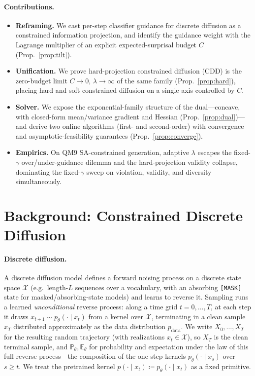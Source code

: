 \documentclass{article}
\newcommand{\E}{\mathbb{E}}
\newcommand{\X}{\mathcal{X}}
\begin{document}
\paragraph{Contributions.}
\begin{itemize}
\item \textbf{Reframing.} We cast per-step classifier guidance for discrete diffusion as a constrained information projection, and identify the guidance weight with the Lagrange multiplier of an explicit expected-surprisal budget $C$ (Prop.~\ref{prop:tilt}).
\item \textbf{Unification.} We prove hard-projection constrained diffusion (CDD) is the zero-budget limit $C\!\to\!0$, $\lambda\!\to\!\infty$ of the same family (Prop.~\ref{prop:hard}), placing hard and soft constrained diffusion on a single axis controlled by $C$.
\item \textbf{Solver.} We expose the exponential-family structure of the dual---concave, with closed-form mean/variance gradient and Hessian (Prop.~\ref{prop:dual})---and derive two online algorithms (first- and second-order) with convergence and asymptotic-feasibility guarantees (Prop.~\ref{prop:converge}).
\item \textbf{Empirics.} On QM9 SA-constrained generation, adaptive $\lambda$ escapes the fixed-$\gamma$ over/under-guidance dilemma and the hard-projection validity collapse, dominating the fixed-$\gamma$ sweep on violation, validity, and diversity simultaneously.
\end{itemize}

\section{Background: Constrained Discrete Diffusion}
\label{sec:background}

\paragraph{Discrete diffusion.} A discrete diffusion model defines a forward noising process on a discrete state space $\X$ (e.g.\ length-$L$ sequences over a vocabulary, with an absorbing \texttt{[MASK]} state for masked/absorbing-state models) and learns to reverse it. Sampling runs a learned \emph{unconditional} reverse process: along a time grid $t=0,\dots,T$, at each step it draws $x_{t+1}\sim p_\theta(\cdot\mid x_t)$ from a kernel over $\X$, terminating in a clean sample $x_T$ distributed approximately as the data distribution $p_{\mathrm{data}}$. We write $X_0,\dots,X_T$ for the resulting random trajectory (with realizations $x_t\in\X$), so $X_T$ is the clean terminal sample, and $\mathbb P_\theta,\E_\theta$ for probability and expectation under the law of this full reverse process---the composition of the one-step kernels $p_\theta(\cdot\mid x_s)$ over $s\ge t$. We treat the pretrained kernel $p(\cdot\mid x_t)\coloneqq p_\theta(\cdot\mid x_t)$ as a fixed primitive.
\end{document}
